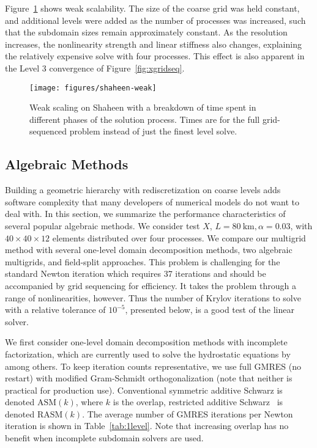\documentclass[draft,lineno,jgrga]{AGUTeX}
\newcommand{\ASM}{\mathrm{ASM}}
\newcommand{\RASM}{\mathrm{RASM}}
\begin{document}
\begin{article}
Figure~\ref{fig:shaheen-weak} shows weak scalability.
The size of the coarse grid was held constant, and additional levels were added as the number of processes was increased, such that the subdomain sizes remain approximately constant.
As the resolution increases, the nonlinearity strength and linear stiffness also changes, explaining the relatively expensive solve with four processes.
This effect is also apparent in the Level 3 convergence of Figure~\ref{fig:xgridseq}.

\begin{figure}
  \texttt{[image: figures/shaheen-weak]}
  \centering\caption{Weak scaling on Shaheen with a breakdown of time spent in different phases of the solution process.
    Times are for the full grid-sequenced problem instead of just the finest level solve.}\label{fig:shaheen-weak}
\end{figure}

\subsection{Algebraic Methods}\label{sec:1level}
Building a geometric hierarchy with rediscretization on coarse levels adds software complexity that many developers of numerical models do not want to deal with.  In this section, we summarize the performance characteristics of several popular algebraic methods.  We consider test $X$, $L = \SI{80}{\kilo\metre}, \alpha=0.03$, with $40\times 40\times 12$ elements distributed over four processes. We compare our multigrid method with several one-level domain decomposition methods, two algebraic multigrids, and field-split approaches. This problem is challenging for the standard Newton iteration which requires 37 iterations and should be accompanied by grid sequencing for efficiency. It takes the problem through a range of nonlinearities, however. Thus the number of Krylov iterations to solve with a relative tolerance of $10^{-5}$, presented below, is a good test of the linear solver.

We first consider one-level domain decomposition methods with incomplete factorization, which are currently used to solve the hydrostatic equations by \citep{seacism,issm} among others.  To keep iteration counts representative, we use full GMRES (no restart) with modified Gram-Schmidt orthogonalization (note that neither is practical for production use).  Conventional symmetric additive Schwarz is denoted $\ASM(k)$, where $k$ is the overlap, restricted additive Schwarz~\citep{cai1999restricted} is denoted $\RASM(k)$.  The average number of GMRES iterations per Newton iteration is shown in Table~\ref{tab:1level}.  Note that increasing overlap has no benefit when incomplete subdomain solvers are used.


\end{article}
\end{document}
